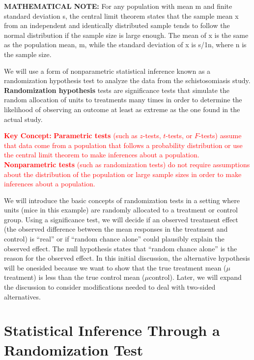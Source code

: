\documentclass[
]{report}
\theoremstyle{definition}
\theoremstyle{definition}
\theoremstyle{definition}
\theoremstyle{definition}
\theoremstyle{remark}
\begin{document}
\large

\textbf{MATHEMATICAL NOTE:}
For any population with mean m and finite standard deviation s, the central limit theorem states that
the sample mean x from an independent and identically distributed sample tends to follow the normal
distribution if the sample size is large enough. The mean of x is the same as the population mean, m, while
the standard deviation of x is s/1n, where n is the sample size.

\normalsize

We will use a form of nonparametric statistical inference known as a randomization hypothesis test to analyze the data from the schistosomiasis study. \textbf{Randomization hypothesis} tests are significance tests that simulate the random allocation of units to treatments many times in order to determine the likelihood of observing an outcome at least as extreme as the one found in the actual study.

\Large

\textbf{\textcolor{red}{Key Concept:}}
\textcolor{red}{\textbf{Parametric tests} (such as $z$-tests, $t$-tests, or $F$-tests) assume that data come from a population that follows a probability distribution or use the central limit theorem to make inferences about a population. \textbf{Nonparametric tests} (such as randomization tests) do not require assumptions about the distribution of the population or large sample sizes in order to make inferences about a population.}

\normalsize

We will introduce the basic concepts of randomization tests in a setting where units (mice in this example) are randomly allocated to a treatment or control group. Using a significance test, we will decide if an observed treatment effect (the observed difference between the mean responses in the treatment and control) is ``real'' or if ``random chance alone'' could plausibly explain the observed effect. The null hypothesis states that ``random chance alone'' is the reason for the observed effect. In this initial discussion, the alternative hypothesis will be onesided because we want to show that the true treatment mean (\(\mu\)treatment) is less than the true control mean (\(\mu\)control). Later, we will expand the discussion to consider modifications needed to deal with two-sided alternatives.

\hypertarget{statistical-inference-through-a-randomization-test}{%
\section{\texorpdfstring{\textbf{Statistical Inference Through a Randomization Test}}{Statistical Inference Through a Randomization Test}}\label{statistical-inference-through-a-randomization-test}}
\end{document}
